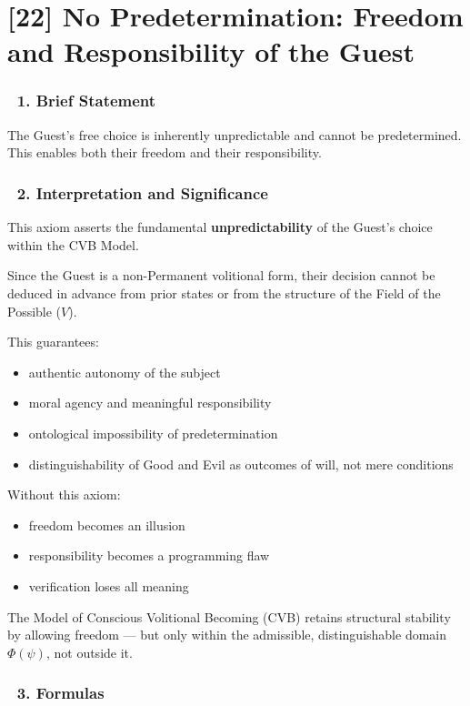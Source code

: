\documentclass[12pt]{article}
\begin{document}
\section*{[22] No Predetermination: Freedom and Responsibility of the Guest}

\subsubsection*{🔹 1. Brief Statement}

The Guest’s free choice is inherently unpredictable and cannot be predetermined. This enables both their freedom and their responsibility.

\subsubsection*{🔹 2. Interpretation and Significance}

This axiom asserts the fundamental \textbf{unpredictability} of the Guest’s choice within the CVB Model.

Since the Guest is a non-Permanent volitional form, their decision cannot be deduced in advance from prior states or from the structure of the Field of the Possible ($V$).

This guarantees:

\begin{itemize}
\item authentic autonomy of the subject
\item moral agency and meaningful responsibility
\item ontological impossibility of predetermination
\item distinguishability of Good and Evil as outcomes of will, not mere conditions
\end{itemize}

Without this axiom:

\begin{itemize}
\item freedom becomes an illusion
\item responsibility becomes a programming flaw
\item verification loses all meaning
\end{itemize}

The Model of Conscious Volitional Becoming (CVB) retains structural stability by allowing freedom — but only within the admissible, distinguishable domain $\Phi(\psi)$, not outside it.

\subsubsection*{🔹 3. Formulas}
\end{document}
